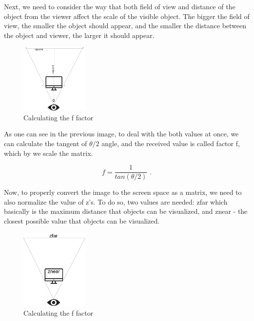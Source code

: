 Next, we need to consider the way that both field of view and distance of the object from the viewer affect the scale of the visible object. The bigger the field of view, the smaller the object should appear, and the smaller the distance  between the object and viewer, the larger it should appear.
\begin{figure}[H]
  \begin{center}
  \includegraphics[width=0.3\textwidth]{figures/f_factor.png}  
  \end{center}
  \caption{Calculating the f factor}
\end{figure}

 As one can see in the previous image, to deal with the both values at once, we can calculate the tangent of $\theta/2$ angle, and the received value is called factor f, which by we scale the matrix.

\begin{equation}
f=\frac{1}{tan(\theta / 2)}
\text{ .}
\label{fequation}
\end{equation} 

Now, to properly convert the image to the screen space as a matrix, we need to also normalize the value of z's. To do so, two values are needed: zfar which basically is the maximum distance that objects can be visualized, and znear - the closest possible value that objects can be visualized. 

\begin{figure}[H]
  \begin{center}
  \includegraphics[width=0.3\textwidth]{figures/normalizing_z.png}  
  \end{center}
  \caption{Calculating the f factor}
\end{figure}


